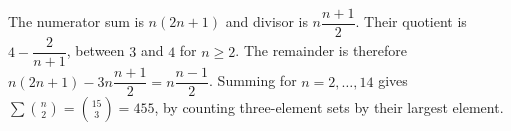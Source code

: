 The numerator sum is $n(2n+1)$ and divisor is $n\dfrac{n+1}{2}$. Their quotient is $4-\dfrac{2}{n+1}$, between $3$ and $4$ for $n\ge 2$. The remainder is therefore $n(2n+1)-3n\dfrac{n+1}{2}=n\dfrac{n-1}{2}$. Summing for $n=2,\ldots,14$ gives $\sum\binom n2=\binom{15}{3}=\boxed{455}$, by counting three-element sets by their largest element.
